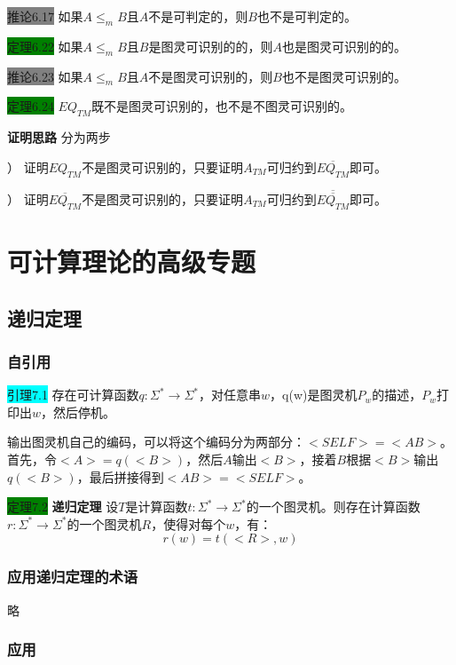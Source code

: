 \documentclass[a4paper]{article}
\begin{document}
	\colorbox{gray}{推论6.17} 如果$A \leq_m B$且$A$不是可判定的，则$B$也不是可判定的。

	\colorbox{green}{定理6.22} 如果$A \leq_m B$且$B$是图灵可识别的的，则$A$也是图灵可识别的的。
	
	\colorbox{gray}{推论6.23} 如果$A \leq_m B$且$A$不是图灵可识别的，则$B$也不是图灵可识别的。
	
	\colorbox{green}{定理6.24} $EQ_{TM}$既不是图灵可识别的，也不是不图灵可识别的。
	
	\textbf{证明思路} \quad 分为两步
	
	） 证明$EQ_{TM}$不是图灵可识别的，只要证明$A_{TM}$可归约到$\overline{EQ_{TM}}$即可。
	
	） 证明$\overline{EQ_{TM}}$不是图灵可识别的，只要证明$A_{TM}$可归约到$\overline{\overline{EQ_{TM}}}$即可。

\section{可计算理论的高级专题}

\subsection{递归定理}

\subsubsection{自引用}

	\colorbox{cyan}{引理7.1} 存在可计算函数$q:\Sigma^* \rightarrow \Sigma^*$，对任意串$w$，q(w)是图灵机$P_w$的描述，$P_w$打印出$w$，然后停机。

	输出图灵机自己的编码，可以将这个编码分为两部分：$<SELF>=<AB>$。首先，令$<A>=q(<B>)$，然后$A$输出$<B>$，接着$B$根据$<B>$输出$q(<B>)$，最后拼接得到$<AB>=<SELF>$。

	\colorbox{green}{定理7.2} \textbf{递归定理} \quad 设$T$是计算函数$t:\Sigma^* \rightarrow \Sigma^*$的一个图灵机。则存在计算函数$r:\Sigma^* \rightarrow \Sigma^*$的一个图灵机$R$，使得对每个$w$，有：
	$$r(w)=t(<R>,w)$$

\subsubsection{应用递归定理的术语}

	略

\subsubsection{应用}
\end{document}
